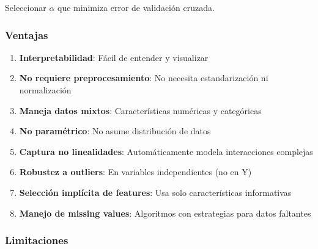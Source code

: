 \documentclass[
  doc,
  floatsintext,
  longtable,
  a4paper,
  nolmodern,
  notxfonts,
  notimes,
  12pt,
  colorlinks=true,linkcolor=blue,citecolor=blue,urlcolor=blue]{apa7}
\begin{document}
Seleccionar \(\alpha\) que minimiza error de validación cruzada.

\subsubsection{Ventajas}\label{ventajas-2}

\begin{enumerate}
\def\labelenumi{\arabic{enumi}.}
\item
  \textbf{Interpretabilidad}: Fácil de entender y visualizar
\item
  \textbf{No requiere preprocesamiento}: No necesita estandarización ni
  normalización
\item
  \textbf{Maneja datos mixtos}: Características numéricas y categóricas
\item
  \textbf{No paramétrico}: No asume distribución de datos
\item
  \textbf{Captura no linealidades}: Automáticamente modela interacciones
  complejas
\item
  \textbf{Robustez a outliers}: En variables independientes (no en Y)
\item
  \textbf{Selección implícita de features}: Usa solo características
  informativas
\item
  \textbf{Manejo de missing values}: Algoritmos con estrategias para
  datos faltantes
\end{enumerate}

\subsubsection{Limitaciones}\label{limitaciones-2}
\end{document}
